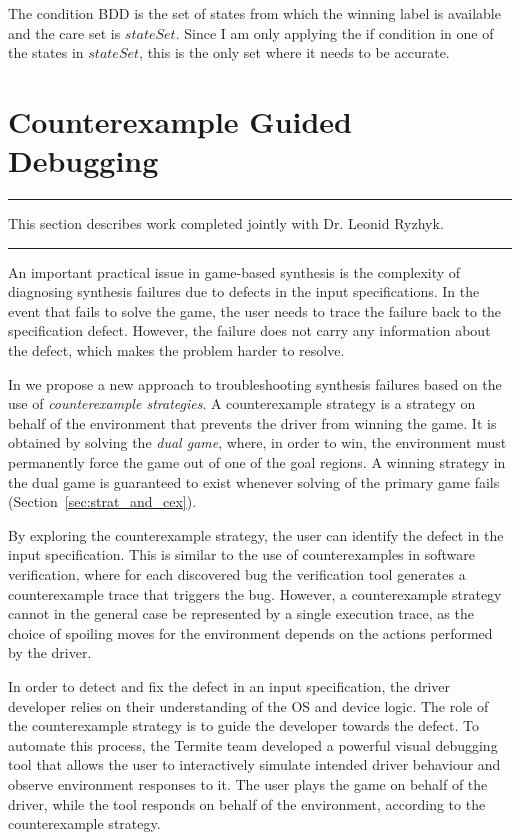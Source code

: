 The condition BDD is the set of states from which the winning label is available and the care set is $stateSet$. Since I am only applying the if condition in one of the states in $stateSet$, this is the only set where it needs to be accurate. 

\section{Counterexample Guided Debugging}
\label{s:debug}
\hrule
\vspace{10pt}
\begin{center}
This section describes work completed jointly with Dr. Leonid Ryzhyk. 
\end{center}
\hrule
\vspace{20pt}

An important practical issue in game-based synthesis is the complexity of diagnosing synthesis failures due to defects in the input specifications.  In the event that \termite fails to solve the game, the user needs to trace the failure back to the specification defect.  However, the failure does not carry any information about the defect, which makes the problem harder to resolve.

In \termite we propose a new approach to troubleshooting synthesis failures based on the use of \emph{counterexample strategies}.  A counterexample strategy is a strategy on behalf of the environment that prevents the driver from winning the game.  It is obtained by solving the \emph{dual game}, where, in order to win, the environment must permanently force the game out of one of the goal regions.  A winning strategy in the dual game is guaranteed to exist whenever solving of the primary game fails (Section~\ref{sec:strat_and_cex}).

By exploring the counterexample strategy, the user can identify the defect in the input specification.  This is similar to the use of counterexamples in software verification, where for each discovered bug the verification tool generates a counterexample trace that triggers the bug.  However, a counterexample strategy cannot in the general case be represented by a single execution trace, as the choice of spoiling moves for the environment depends on the actions performed by the driver.

In order to detect and fix the defect in an input specification, the driver developer relies on their  understanding of the OS and device logic.  The role of the counterexample strategy is to guide the developer towards the defect.  To automate this process, the Termite team developed a powerful visual debugging tool that allows the user to interactively simulate intended driver behaviour and observe environment responses to it.  The user plays the game on behalf of the driver, while the tool responds on behalf of the environment, according to the counterexample strategy.
 
